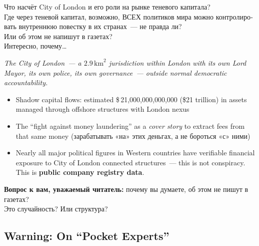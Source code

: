 \documentclass[11pt,a4paper]{article}
\theoremstyle{definition}
\theoremstyle{remark}
\begin{document}
\begin{londonbox}
\foreignlanguage{russian}{
Что насчёт City of London и его роли
на рынке теневого капитала?\\[0.2cm]
Где через теневой капитал, возможно, ВСЕХ политиков мира
можно контролировать внутреннюю повестку в их странах~---
не правда ли?\\[0.2cm]
Или об этом не напишут в газетах?\\
Интересно, почему\dots\\[0.2cm]
}

\textit{The City of London~--- a $2.9\,\text{km}^2$ jurisdiction
within London with its own Lord Mayor, its own police,
its own governance~--- outside normal democratic accountability.}\\[0.3cm]

\begin{itemize}[noitemsep]
  \item Shadow capital flows: estimated
    \$\,21{,}000{,}000{,}000{,}000 (\$21 trillion)
    in assets managed through offshore structures with London nexus
  \item The ``fight against money laundering'' as a
    \textit{cover story} to extract fees from that same money
    \foreignlanguage{russian}{(зарабатывать «на» этих деньгах,
    а не бороться «с» ними)}
  \item Nearly all major political figures in Western countries
    have verifiable financial exposure to City of London
    connected structures~--- this is not conspiracy.
    This is \textbf{public company registry data}.
\end{itemize}

\vspace{0.2cm}
\foreignlanguage{russian}{
\textbf{Вопрос к вам, уважаемый читатель:}
почему вы думаете, об этом не пишут в газетах?\\
Это случайность? Или структура?
}
\end{londonbox}

\subsection{Warning: On ``Pocket Experts''}
\label{sec:london-warning}
\end{document}
